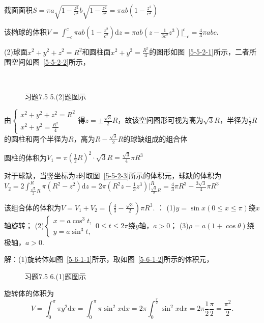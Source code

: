 \documentclass[12pt,UTF8]{ctexart}
\begin{document}
\begin{enumerate}
截面面积$S=\pi a\sqrt{1-\frac{z^2}{c^2}}b\sqrt{1-\frac{z^2}{c^2}}=\pi ab(1-\frac{z^2}{c^2})$

该椭球的体积$V=\int_{-c}^c\pi ab(1-\frac{z^2}{c^2})\mathrm dz=\pi ab(z-\frac1{3c^2}z^3)\Big|_{-c}^c=\frac43\pi abc$.

(2)球面$x^2+y^2+z^2=R^2$和圆柱面$x^2+y^2=\frac{R^2}4$的图形如图~\ref{5-5-2-1}所示，二者所围空间如图~\ref{5-5-2-2}所示，
\begin{figure}[H]
\begin{center}
    \\
\end{center}
\caption{习题7.5 5.(2)题图示}
\label{5-5-2}
\end{figure}
由$\begin{cases}
x^2+y^2+z^2=R^2\\
x^2+y^2=\frac{R^2}4
\end{cases}$得$z=\pm\frac{\sqrt3}2R$，故该空间图形可视为高为$\sqrt3R$，半径为$\frac12R$的圆柱和两个半径为$R$，高为$R-\frac{\sqrt3}2R$的球缺组成的组合体

圆柱的体积为$V_1=\pi(\frac12R)^2\cdot\sqrt3R=\frac{\sqrt3}4\pi R^3$

对于球缺，当竖坐标为$z$时取图~\ref{5-5-2-3}所示的体积元，球缺的体积为$V_2=2\int_{\frac{\sqrt3}2R}^R\pi(R^2-z^2)\mathrm dz=2\pi (R^2z-\frac13z^3)\Big|_{\frac{\sqrt3}2R}^R=\frac43\pi R^3-\frac{3\sqrt3}4\pi R^3$

该组合体的体积为$V=V_1+V_2=(\frac43-\frac{\sqrt3}2)\pi R^3$.
：
\newline
(1)$y=\sin x(0\leq x\leq\pi)$绕$x$轴旋转；
\newline
(2)$\begin{cases}
x=a\cos^3t,\\
y=a\sin^3t,
\end{cases}0\leq t\leq2\pi$绕$y$轴，$a>0$；
\newline
(3)$\rho=a(1+\cos\theta)$绕极轴，$a>0$.

解：(1)旋转体如图~\ref{5-6-1-1}所示，取如图~\ref{5-6-1-2}所示的体积元，
\begin{figure}[H]
\begin{center}
\end{center}
\caption{习题7.5 6.(1)题图示}
\label{5-6-1}
\end{figure}
旋转体的体积为
\[V=\int_0^\pi\pi y^2\mathrm dx=\int_0^\pi\pi \sin^2x\mathrm dx=2\pi\int_0^{\frac\pi2}\sin^2x\mathrm dx=2\pi\frac12\frac\pi2=\frac{\pi^2}2.\]


\end{enumerate}
\end{document}
